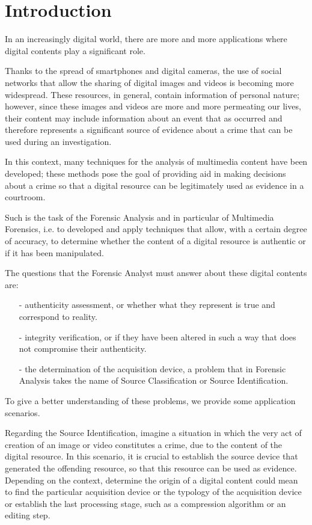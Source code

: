 \chapter*{Introduction}

In an increasingly digital world, there are more and more applications where digital contents play a significant role.

Thanks to the spread of smartphones and digital cameras, the use of social networks that allow the sharing of digital images and videos is becoming more widespread. These resources, in general, contain information of personal nature; however, since these images and videos are more and more permeating our lives, their content may include information about an event that as occurred and therefore represents a significant source of evidence about a crime that can be used during an investigation.

In this context, many techniques for the analysis of multimedia content have been developed; these methods pose the goal of providing aid in making decisions about a crime so that a digital resource can be legitimately used as evidence in a courtroom.

Such is the task of the Forensic Analysis and in particular of Multimedia Forensics, i.e. to developed and apply techniques that allow, with a certain degree of accuracy, to determine whether the content of a digital resource is authentic or if it has been manipulated.

The questions that the Forensic Analyst must answer about these digital contents are:
\begin{itemize}
\item[-] authenticity assessment, or whether what they represent is true and correspond to reality.
\item[-] integrity verification, or if they have been altered in such a way that does not compromise their authenticity.
\item[-] the determination of the acquisition device, a problem that in Forensic Analysis takes the name of Source Classification or Source Identification.
\end{itemize}

To give a better understanding of these problems, we provide some application scenarios.

Regarding the Source Identification, imagine a situation in which the very act of creation of an image or video constitutes a crime, due to the content of the digital resource. In this scenario, it is crucial to establish the source device that generated the offending resource, so that this resource can be used as evidence. Depending on the context, determine the origin of a digital content could mean to find the particular acquisition device or the typology of the acquisition device or establish the last processing stage, such as a compression algorithm or an editing step.

